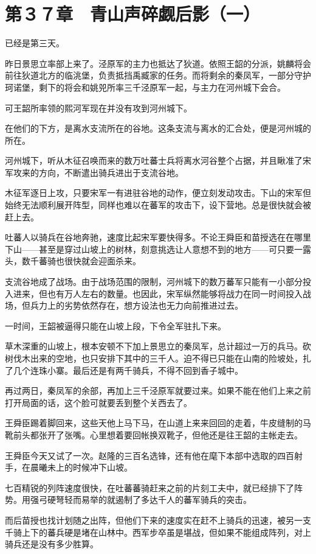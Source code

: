 \section{第３７章　青山声碎觑后影（一）}

已经是第三天。

昨日景思立率部上来了。泾原军的主力也抵达了狄道。依照王韶的分派，姚麟将会前往狄道北方的临洮堡，负责抵挡禹臧家的任务。而将剩余的秦凤军，一部分守护珂诺堡，剩下的将会和姚兕所率三千泾原军一起，与主力在河州城下会合。

可王韶所率领的熙河军现在并没有攻到河州城下。

在他们的下方，是离水支流所在的谷地。这条支流与离水的汇合处，便是河州城的所在。

河州城下，听从木征召唤而来的数万吐蕃士兵将离水河谷整个占据，并且瞅准了宋军攻来的方向，不断遣出骑兵进出于支流谷地。

木征军逐日上攻，只要宋军一有进驻谷地的动作，便立刻发动攻击。下山的宋军但始终无法顺利展开阵型，同样也难以在蕃军的攻击下，设下营地。总是很快就会被赶上去。

吐蕃人以骑兵在谷地奔驰，速度比起宋军要快得多。不论王舜臣和苗授选在在哪里下山——甚至是穿过山坡上的树林，刻意挑选让人意想不到的地方——可只要一露头，数千蕃骑也很快就会迎面杀来。

支流谷地成了战场。由于战场范围的限制，河州城下的数万蕃军只能有一小部分投入进来，但也有万人左右的数量。也因此，宋军纵然能够将战力在同一时间投入战场，但兵力上的劣势依然存在，想方设法也无力向前推进过去。

一时间，王韶被逼得只能在山坡上段，下令全军驻扎下来。

草木深重的山坡上，根本安顿不下加上景思立的秦凤军，总计超过一万的兵马。砍树伐木出来的空地，也只安排下其中的三千人。迫不得已只能在山南的险坡处，扎了几个连珠小寨。最后还是有两千骑兵，不得不回到香子城中。

再过两日，秦凤军的余部，再加上三千泾原军就要过来。如果不能在他们上来之前打开局面的话，这个脸可就要丢到整个关西去了。

王舜臣踢着脚回来，这些天他上马下马，在山道上来来回回的走着，牛皮缝制的马靴前头都张开了张嘴。心里想着要回帐换双靴子，但他还是往王韶的主帐走去。

王舜臣今天又试了一次。赵隆的三百名选锋，还有他在麾下本部中选取的四百射手，在晨曦未上的时候冲下山坡。

七百精锐的列阵速度很快，在吐蕃蕃骑赶来之前的片刻工夫中，就已经排下了阵势。用强弓硬弩轻而易举的就遏制了多达千人的蕃军骑兵的突击。

而后苗授也找计划随之出阵，但他们下来的速度实在赶不上骑兵的迅速，被另一支千骑上下的蕃兵硬是堵在山林中。西军步卒虽是堪战，但如果不能组成阵列，对上骑兵还是没有多少胜算。


